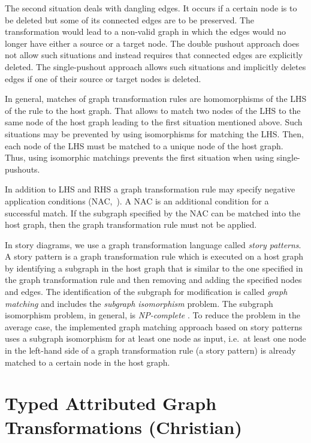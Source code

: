 The second situation deals with dangling edges. It occurs if a certain node is
to be deleted but some of its connected edges are to be preserved. The
transformation would lead to a non-valid graph in which the edges would no longer have
either a source or a target node. The double pushout approach does not allow
such situations and instead requires that connected edges are explicitly
deleted. The single-pushout approach allows such situations and implicitly
deletes edges if one of their source or target nodes is deleted.

In general, matches of graph transformation rules are homomorphisms of the LHS of the rule to the host graph.
That allows to match two nodes of the LHS to the same node of the host graph leading to the first situation mentioned above.
Such situations may be prevented by using isomorphisms for matching the LHS. Then, each node of the LHS must be matched to a unique node of the host graph.
Thus, using isomorphic matchings prevents the first situation when using single-pushouts.

In addition to LHS and RHS a graph transformation rule may specify negative application conditions (NAC,~\cite{Roz97}).
A NAC is an additional condition for a successful match.
If the subgraph specified by the NAC can be matched into the host graph, then the graph transformation rule must not be applied.

In story diagrams, we use a graph transformation language called \emph{story patterns}.
A story pattern is a graph transformation rule which is executed on a host graph by identifying a subgraph in the host graph
that is similar to the one specified in the graph transformation rule
and then removing and adding the specified nodes and edges.
The identification of the subgraph for modification is called \emph{graph matching} and includes the \emph{subgraph isomorphism} problem.
The subgraph isomorphism problem, in general, is \emph{NP-complete} \cite{Epp95}.
To reduce the problem in the average case, the implemented graph matching approach based on story patterns
uses a subgraph isomorphism for at least one node as input,
i.e.\ at least one node in the left-hand side of a graph transformation rule (a story pattern) is already matched to a certain node in the host graph.


\section{Typed Attributed Graph Transformations (Christian)}
\label{sec:foundations:typedAttrGTS}

